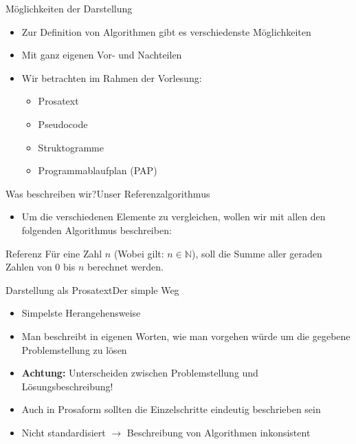 \begin{frame}{Möglichkeiten der Darstellung}{}
    \begin{itemize}[<+->]
        \item Zur Definition von Algorithmen gibt es verschiedenste Möglichkeiten
        \item Mit ganz eigenen Vor- und Nachteilen
        \item Wir betrachten im Rahmen der Vorlesung:
        \begin{itemize}
            \item Prosatext
            \item Pseudocode
            \item Struktogramme
            \item Programmablaufplan (PAP)
        \end{itemize}
    \end{itemize}
\end{frame}

\begin{frame}{Was beschreiben wir?}{Unser Referenzalgorithmus}
    \begin{itemize}
        \item Um die verschiedenen Elemente zu vergleichen, wollen wir mit allen den folgenden Algorithmus beschreiben:
    \end{itemize}
    \pause
    \begin{alertblock}{Referenz}
        Für eine Zahl $n$ (Wobei gilt: $n \in \mathbb{N} $), soll die Summe aller geraden Zahlen von $0$ bis $n$ berechnet werden.
    \end{alertblock}
\end{frame}

\begin{frame}{Darstellung als Prosatext}{Der simple Weg}
    \begin{itemize}
        \item Simpelste Herangehensweise
        \item Man beschreibt in eigenen Worten, wie man vorgehen würde um die gegebene Problemstellung zu lösen
        \item \textbf{Achtung:} Unterscheiden zwischen Problemstellung und Lösungsbeschreibung!
        \item Auch in Prosaform sollten die Einzelschritte eindeutig beschrieben sein
        \item Nicht standardisiert $\rightarrow$ Beschreibung von Algorithmen inkonsistent
    \end{itemize}
\end{frame}

